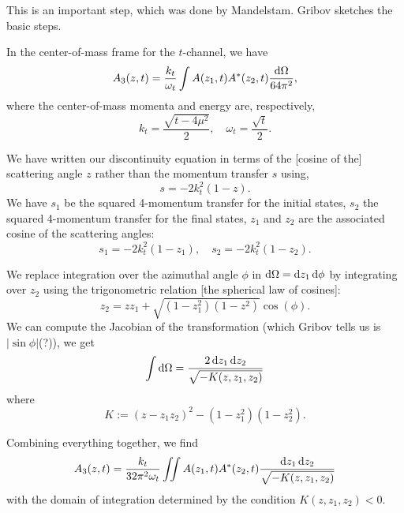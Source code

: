 This is an important step, which was done by Mandelstam. Gribov sketches
the basic steps.

\M[1]
In the center-of-mass frame for the $t$-channel, we have
\begin{equation}
A_{3}(z,t) = \frac{k_{t}}{\omega_{t}}\int A(z_{1},t)A^{*}(z_{2},t)\frac{\mathrm{d}\Omega}{64\pi^{2}},
\end{equation}
where the center-of-mass momenta and energy are, respectively,
\begin{equation}
k_{t}=\frac{\sqrt{t-4\mu^{2}}}{2},\quad\omega_{t}=\frac{\sqrt{t}}{2}.
\end{equation}

\M We have written our discontinuity equation in terms of the [cosine of
  the] scattering angle $z$ rather than the momentum transfer $s$ using,
\begin{equation}
s = -2k_{t}^{2}(1-z).
\end{equation}
We have $s_{1}$ be the squared 4-momentum transfer for the initial
states, $s_{2}$ the squared 4-momentum transfer for the final states,
$z_{1}$ and $z_{2}$ are the associated cosine of the scattering angles:
\begin{equation}
  s_{1} = -2k_{t}^{2}(1-z_{1}),\quad
  s_{2} = -2k_{t}^{2}(1-z_{2}).
\end{equation}

\M
We replace integration over the azimuthal angle $\phi$ in $\mathrm{d}\Omega=\mathrm{d} z_{1}\,\mathrm{d}\phi$ by 
integrating over $z_{2}$ using the trigonometric relation [the spherical
law of cosines]:
\begin{equation}
z_{2} = zz_{1} + \sqrt{(1 - z_{1}^{2})(1 - z^{2})}\cos(\phi).
\end{equation}
We can compute the Jacobian of the transformation (which Gribov tells us
is $|\sin\phi|$(?)), we get
\begin{equation}
\int\mathrm{d}\Omega = \frac{2\,\mathrm{d} z_{1}\,\mathrm{d} z_{2}}{\sqrt{-K(z,z_{1},z_{2})}}
\end{equation}
where
\begin{equation}
K := (z - z_{1}z_{2})^{2} - (1 - z_{1}^{2})(1 - z_{2}^{2}).
\end{equation}

\M Combining everything together, we find
\begin{equation}\label{eq:t-channel:discontinuity-in-terms-of-z}
A_{3}(z,t) = \frac{k_{t}}{32\pi^{2}\omega_{t}}\iint
A(z_{1},t)A^{*}(z_{2},t)\frac{\mathrm{d} z_{1}\,\mathrm{d} z_{2}}{\sqrt{-K(z,z_{1},z_{2})}}
\end{equation}
with the domain of integration determined by the condition
$K(z,z_{1},z_{2})<0$.

